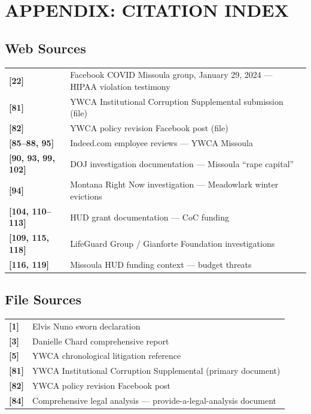 \documentclass[11pt,letterpaper]{article}
\begin{document}
\newpage

\section{APPENDIX: CITATION INDEX}

\subsection{Web Sources}

\begin{tabular}{lp{4.5in}}
\textbf{[22]} & Facebook COVID Missoula group, January 29, 2024 --- HIPAA violation testimony\\
\textbf{[81]} & YWCA Institutional Corruption Supplemental submission (file)\\
\textbf{[82]} & YWCA policy revision Facebook post (file)\\
\textbf{[85--88, 95]} & Indeed.com employee reviews --- YWCA Missoula\\
\textbf{[90, 93, 99, 102]} & DOJ investigation documentation --- Missoula ``rape capital''\\
\textbf{[94]} & Montana Right Now investigation --- Meadowlark winter evictions\\
\textbf{[104, 110--113]} & HUD grant documentation --- CoC funding\\
\textbf{[109, 115, 118]} & LifeGuard Group / Gianforte Foundation investigations\\
\textbf{[116, 119]} & Missoula HUD funding context --- budget threats\\
\end{tabular}

\subsection{File Sources}

\begin{tabular}{lp{4.5in}}
\textbf{[1]} & Elvis Nuno sworn declaration\\
\textbf{[3]} & Danielle Chard comprehensive report\\
\textbf{[5]} & YWCA chronological litigation reference\\
\textbf{[81]} & YWCA Institutional Corruption Supplemental (primary document)\\
\textbf{[82]} & YWCA policy revision Facebook post\\
\textbf{[84]} & Comprehensive legal analysis --- provide-a-legal-analysis document\\
\end{tabular}
\end{document}
